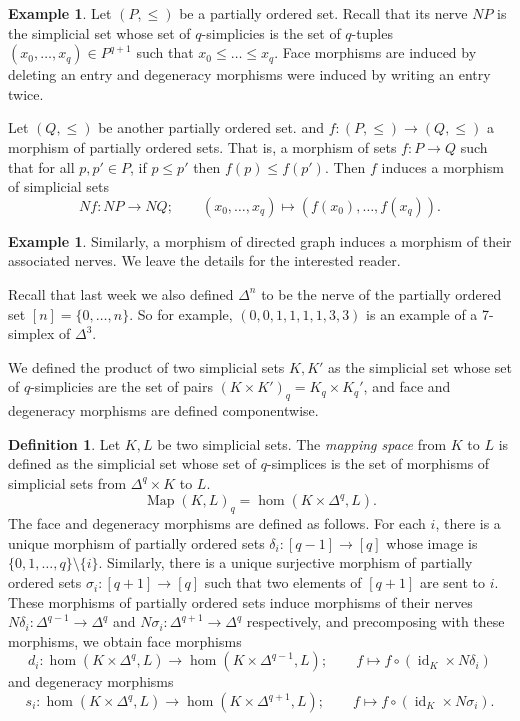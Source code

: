 \documentclass[a4paper]{amsart}
\numberwithin{figure}{section}
\theoremstyle{theorem}
\theoremstyle{definition}
\newtheorem{defi}[thm]{Definition}
\newtheorem{exam}[thm]{Example}
\DeclareMathOperator{\id}{id}
\DeclareMathOperator{\Map}{Map}
\begin{document}
\vspace{\baselineskip}

\begin{mdframed}
\begin{exam}
Let $(P, \leq)$ be a partially ordered set. Recall that its nerve $NP$ is the simplicial set whose set of $q$-simplicies is the set of $q$-tuples $(x_0, \dots, x_q) {\in} P^{q+1}$ such that $x_0 \leq \dots \leq x_q$. Face morphisms are induced by deleting an entry and degeneracy morphisms were induced by writing an entry twice.

Let $(Q, \leq)$ be another partially ordered set. and $f: (P, \leq) \to (Q, \leq)$ a morphism of partially ordered sets. That is, a morphism of sets $f: P \to Q$ such that for all $p, p' \in P$, if $p \leq p'$ then $f(p) \leq f(p')$. Then $f$ induces  a morphism of simplicial sets 
\[ Nf: NP \to NQ; \qquad (x_0, \dots, x_q) \mapsto (f(x_0), \dots, f(x_q)). \]
\end{exam}
\end{mdframed}

\begin{exam}
Similarly, a morphism of directed graph induces a morphism of their associated nerves. We leave the details for the interested reader.
\end{exam}

Recall that last week we also defined $\Delta^n$ to be the nerve of the partially ordered set $[n] = \{0, \dots, n\}$. So for example, $(0, 0, 1, 1, 1, 1, 3, 3)$ is an example of a 7-simplex of $\Delta^3$.

We defined the product of two simplicial sets $K, K'$ as the simplicial set whose set of $q$-simplicies are the set of pairs $(K \times K')_q = K_q \times K_q'$, and face and degeneracy morphisms are defined componentwise. \\

\begin{mdframed}
\begin{defi}
Let $K, L$ be two simplicial sets. The \emph{mapping space} from $K$ to $L$ is defined as the simplicial set whose set of $q$-simplices is the set of morphisms of simplicial sets from $\Delta^q \times K$ to $L$.
\[ \Map(K, L)_q = \hom(K {\times} \Delta^q, L). \]
The face and degeneracy morphisms are defined as follows. For each $i$, there is a unique morphism of partially ordered sets $\delta_i: [q{-}1] \to [q]$ whose image is $\{0, 1, \dots, q\} \setminus \{i\}$. Similarly, there is a unique surjective morphism of partially ordered sets $\sigma_i: [q{+}1] \to [q]$ such that two elements of $[q{+}1]$ are sent to $i$. These morphisms of partially ordered sets induce morphisms of their nerves $N\delta_i: \Delta^{q-1} \to \Delta^q$ and $N\sigma_i: \Delta^{q+1} \to \Delta^q$ respectively, and precomposing with these morphisms, we obtain face morphisms
\[ d_i:  \hom(K {\times} \Delta^q, L) \to  \hom(K {\times} \Delta^{q-1}, L); \qquad f \mapsto f \circ (\id_K \times N\delta_i) \]
and degeneracy morphisms
\[ s_i:  \hom(K {\times} \Delta^q, L) \to  \hom(K {\times} \Delta^{q+1}, L); \qquad f \mapsto f \circ (\id_K \times N\sigma_i). \]
\end{defi}
\end{mdframed}
\end{document}

